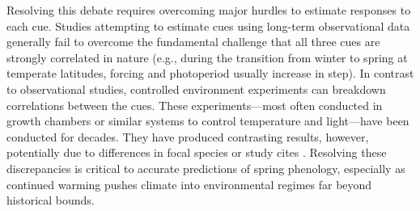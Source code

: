 \documentclass{article}
\begin{document}
\par Resolving this debate requires overcoming major hurdles to estimate responses to each cue. Studies attempting to estimate cues using long-term observational data \citep[e.g.,][]{vitasse2013, zohner2016} generally fail to overcome the fundamental challenge that all three cues are strongly correlated in nature (e.g., during the transition from winter to spring at temperate latitudes, forcing and photoperiod usually increase in step). In contrast to observational studies, controlled environment experiments can breakdown correlations between the cues. These experiments---most often conducted in growth chambers or similar systems to control temperature and light---have been conducted for decades. They have produced contrasting results, however, potentially due to differences in focal species or study cites \citep{zohner2016,Laube:2014a,Basler:2012,Caffarra:2011b,Caffarra:2011a}. Resolving these discrepancies is critical to accurate predictions of spring phenology, especially as continued warming pushes climate into environmental regimes far beyond historical bounds. 

\end{document}
